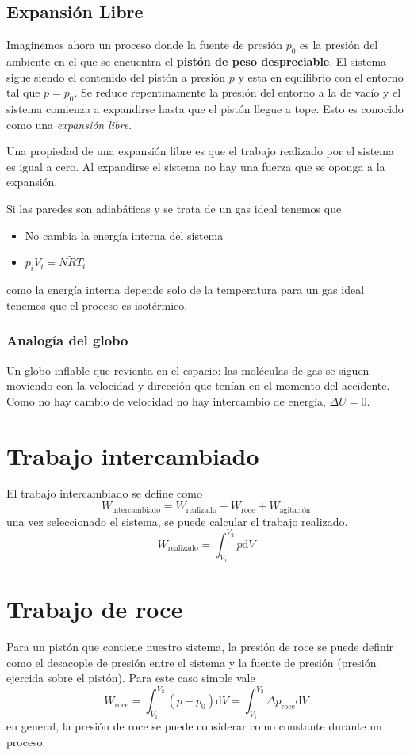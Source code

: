 \documentclass{article}
\newcommand{\di}{\textrm{d}}
\begin{document}
\subsection{Expansión Libre} \label{sec:expansionlibre}
Imaginemos ahora un proceso donde la fuente de presión $p_0$ es la presión del ambiente en el que se encuentra el \textbf{pistón de peso despreciable}. El sistema sigue siendo el contenido del pistón a presión $p$ y esta en equilibrio con el entorno tal que $p=p_0$. Se reduce repentinamente la presión del entorno a la de vacío y el sistema comienza a expandirse hasta que el pistón llegue a tope. Esto es conocido como una \textit{expansión libre}. 

Una propiedad de una expansión libre es que el trabajo realizado por el sistema es igual a cero. Al expandirse el sistema no hay una fuerza que se oponga a la expansión. 

Si las paredes son adiabáticas y se trata de un gas ideal tenemos que 
\begin{itemize}
    \item No cambia la energía interna del sistema
    \item $p_i V_i=N\tilde{R}T_i$
\end{itemize}
como la energía interna depende solo de la temperatura para un gas ideal tenemos que el proceso es isotérmico.

\subsubsection*{Analogía del globo}
Un globo inflable que revienta en el espacio: las moléculas de gas se siguen moviendo con la velocidad y dirección que tenían en el momento del accidente. Como no hay cambio de velocidad no hay intercambio de energía, $\Delta U=0$.



\section{Trabajo intercambiado}
El trabajo intercambiado se define como 
\begin{equation}
    W_{\textrm{intercambiado}}= W_{\textrm{realizado}} - W_{\textrm{roce}} + W_{\textrm{agitación}}
\end{equation}
una vez seleccionado el sistema, se puede calcular el trabajo realizado.
\[
W_{\textrm{realizado}} = \int_{V_1}^{V_2}p \di V
\]

\section{Trabajo de roce}
Para un pistón que contiene nuestro sistema, la presión de roce se puede definir como el desacople de presión entre el sistema y la fuente de presión (presión ejercida sobre el pistón). Para este caso simple vale
\[
W_{\textrm{roce}} = \int_{V_1}^{V_2}(p-p_0)\di V =\int_{V_1}^{V_2}\Delta p_{\textrm{roce}}\di V 
\]
en general, la presión de roce se puede considerar como constante durante un proceso. 
\end{document}
